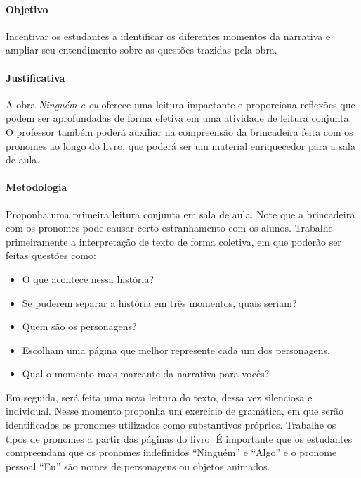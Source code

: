 \documentclass[11pt]{extarticle}
\begin{document}
\paragraph{Objetivo} Incentivar os estudantes a identificar os diferentes momentos da narrativa e ampliar seu entendimento sobre as questões trazidas pela obra.

\paragraph{Justificativa} A obra \textit{Ninguém e eu} oferece uma leitura impactante e proporciona reflexões que podem ser aprofundadas de forma efetiva em uma atividade de leitura conjunta. O professor também poderá auxiliar na compreensão da brincadeira feita com os pronomes ao longo do livro, que poderá ser um material enriquecedor para a sala de aula.

\paragraph{Metodologia} Proponha uma primeira leitura conjunta em sala de aula. Note que a brincadeira com os pronomes pode causar certo estranhamento com os alunos. Trabalhe primeiramente a interpretação de texto de forma coletiva, em que poderão ser feitas questões como:

\begin{itemize}

\item O que acontece nessa história? 

\item Se puderem separar a história em três momentos, quais seriam?

\item Quem são os personagens?

\item Escolham uma página que melhor represente cada um dos personagens.

\item Qual o momento mais marcante da narrativa para vocês?

\end{itemize}

Em seguida, será feita uma nova leitura do texto, dessa vez silenciosa e individual. Nesse momento proponha um exercício de gramática, em que serão identificados os pronomes utilizados como substantivos próprios. Trabalhe os tipos de pronomes a partir das páginas do livro. É importante que os estudantes compreendam que os pronomes indefinidos ``Ninguém'' e ``Algo'' e o pronome pessoal ``Eu'' são nomes de personagens ou objetos animados. 
\end{document}
